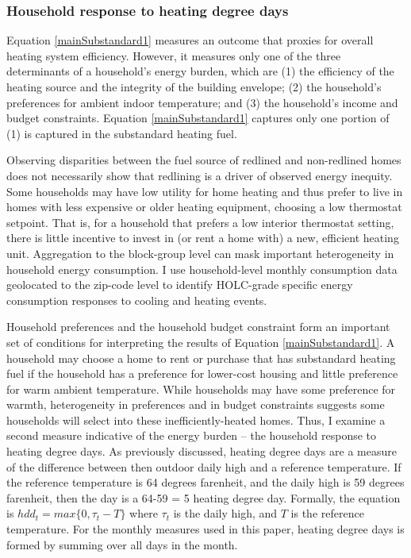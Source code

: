 \documentclass[
]{article}
\begin{document}
\hypertarget{household-response-to-heating-degree-days}{%
\subsubsection{Household response to heating degree days}\label{household-response-to-heating-degree-days}}

Equation \ref{mainSubstandard1} measures an outcome that proxies for overall heating system efficiency. However, it measures only one of the three determinants of a household's energy burden, which are (1) the efficiency of the heating source and the integrity of the building envelope; (2) the household's preferences for ambient indoor temperature; and (3) the household's income and budget constraints. Equation \ref{mainSubstandard1} captures only one portion of (1) is captured in the substandard heating fuel.

Observing disparities between the fuel source of redlined and non-redlined homes does not necessarily show that redlining is a driver of observed energy inequity. Some households may have low utility for home heating and thus prefer to live in homes with less expensive or older heating equipment, choosing a low thermostat setpoint. That is, for a household that prefers a low interior thermostat setting, there is little incentive to invest in (or rent a home with) a new, efficient heating unit. Aggregation to the block-group level can mask important heterogeneity in household energy consumption. I use household-level monthly consumption data geolocated to the zip-code level to identify HOLC-grade specific energy consumption responses to cooling and heating events.

Household preferences and the household budget constraint form an important set of conditions for interpreting the results of Equation \ref{mainSubstandard1}. A household may choose a home to rent or purchase that has substandard heating fuel if the household has a preference for lower-cost housing and little preference for warm ambient temperature. While households may have some preference for warmth, heterogeneity in preferences and in budget constraints suggests some households will select into these inefficiently-heated homes. Thus, I examine a second measure indicative of the energy burden -- the household response to heating degree days. As previously discussed, heating degree days are a measure of the difference between then outdoor daily high and a reference temperature. If the reference temperature is 64 degrees farenheit, and the daily high is 59 degrees farenheit, then the day is a 64-59 = 5 heating degree day. Formally, the equation is \(hdd_t = max\{0, \tau_t - T\}\) where \(\tau_t\) is the daily high, and \(T\) is the reference temperature. For the monthly measures used in this paper, heating degree days is formed by summing over all days in the month.
\end{document}
